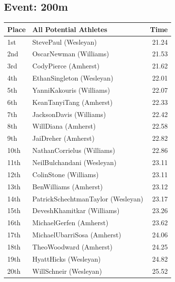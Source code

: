 \documentclass[11pt]{article}
\begin{document}
\subsection*{Event: 200m}
\begin{tabularx}{\linewidth}{lXr}
\toprule
Place & All Potential Athletes & Time \\
\midrule
1st & StevePaul (Wesleyan) & 21.24 \\
2nd & OscarNewman (Williams) & 21.53 \\
3rd & CodyPierce (Amherst) & 21.62 \\
4th & EthanSingleton (Wesleyan) & 22.01 \\
5th & YanniKakouris (Williams) & 22.07 \\
6th & KeanTanyiTang (Amherst) & 22.33 \\
7th & JacksonDavis (Williams) & 22.42 \\
8th & WillDiana (Amherst) & 22.58 \\
9th & JaiDreher (Amherst) & 22.82 \\
10th & NathanCorrielus (Williams) & 22.86 \\
11th & NeilBulchandani (Wesleyan) & 23.11 \\
12th & ColinStone (Williams) & 23.11 \\
13th & BenWilliams (Amherst) & 23.12 \\
14th & PatrickSchechtmanTaylor (Wesleyan) & 23.17 \\
15th & DeveshKhamitkar (Williams) & 23.26 \\
16th & MichaelGerfen (Amherst) & 23.62 \\
17th & MichaelUbarriSosa (Amherst) & 24.06 \\
18th & TheoWoodward (Amherst) & 24.25 \\
19th & HyattHicks (Wesleyan) & 24.82 \\
20th & WillSchneir (Wesleyan) & 25.52 \\
\bottomrule
\end{tabularx}
\end{document}
